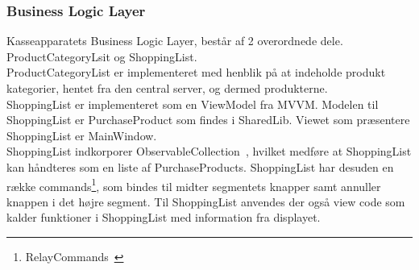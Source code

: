 \subsubsection{Business Logic Layer}
Kasseapparatets Business Logic Layer, består af 2 overordnede dele. ProductCategoryLsit og ShoppingList. \\

ProductCategoryList er implementeret med henblik på at indeholde produkt kategorier, hentet fra den central server, og dermed produkterne. \\

ShoppingList er implementeret som en ViewModel fra MVVM. Modelen til ShoppingList er PurchaseProduct som findes i SharedLib. Viewet som præsentere ShoppingList er MainWindow. \\
ShoppingList indkorporer ObservableCollection~\cite{ObsCol}, hvilket medføre at ShoppingList kan håndteres som en liste af PurchaseProducts. ShoppingList har desuden en række commands\footnote{RelayCommands~\cite{RelayC}}, som bindes til midter segmentets knapper samt annuller knappen i det højre segment.
Til ShoppingList anvendes der også view code som kalder funktioner  i ShoppingList med information fra displayet.